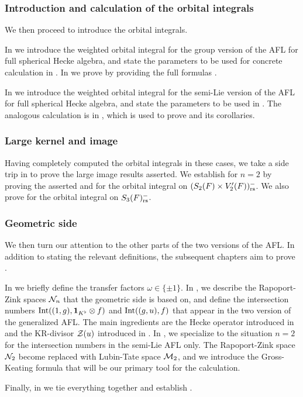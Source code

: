 \subsubsection{Introduction and calculation of the orbital integrals}
We then proceed to introduce the orbital integrals.
\begin{itemize}
  \ii In  we introduce the weighted orbital integral
  for the group version of the AFL for full spherical Hecke algebra,
  and state the parameters to be used for concrete calculation in .
  In  we prove 
  by providing the full formulas
  .

  \ii In  we introduce the weighted orbital integral
  for the semi-Lie version of the AFL for full spherical Hecke algebra,
  and state the parameters to be used in .
  The analogous calculation is in ,
  which is used to prove  and its corollaries.
\end{itemize}

\subsubsection{Large kernel and image}
Having completely computed the orbital integrals in these cases,
we take a side trip in  to prove the large image results asserted.
We establish  for $n = 2$ by proving the asserted
 and 
for the orbital integral on $(S_2(F) \times V'_2(F))_{\mathrm{rs}}^-$.
We also prove  for the orbital integral on $S_3(F)_{\mathrm{rs}}^-$.

\subsubsection{Geometric side}
We then turn our attention to the other parts of the two versions of the AFL.
In addition to stating the relevant definitions,
the subsequent chapters aim to prove .
\begin{itemize}
  \ii In  we briefly define the transfer factors $\omega \in \{\pm1\}$.
  \ii In , we describe the Rapoport-Zink spaces $\mathcal N_n$
  that the geometric side is based on, and define the intersection numbers
  $\operatorname{Int}((1,g), \mathbf{1}_{K^\flat} \otimes f)$ and $\operatorname{Int}((g,u), f)$
  that appear in the two version of the generalized AFL.
  The main ingredients are the Hecke operator introduced in \cite{ref:AFLspherical}
  and the KR-divisor $\mathcal Z(u)$ introduced in \cite{ref:KR}.
  \ii In , we specialize to the situation $n = 2$
  for the intersection numbers in the semi-Lie AFL only.
  The Rapoport-Zink space $\mathcal N_2$ become replaced with Lubin-Tate space $\mathcal M_2$,
  and we introduce the Gross-Keating formula
  that will be our primary tool for the calculation.
\end{itemize}
Finally, in  we tie everything together and establish
.

